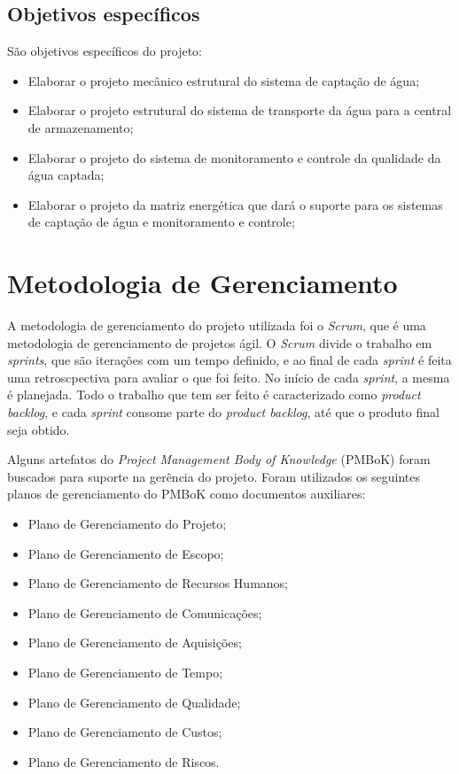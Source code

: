  \subsection{Objetivos específicos}
 
 São objetivos específicos do projeto:
 \begin{itemize}
  \item Elaborar o projeto mecânico estrutural do sistema de captação de água;
  \item Elaborar o projeto estrutural do sistema de transporte da água para a central de armazenamento;
  \item Elaborar o projeto do sistema de monitoramento e controle da qualidade da água captada;
  \item Elaborar o projeto da matriz energética que dará o suporte para os sistemas de captação de água e monitoramento e controle;
 \end{itemize}

 
\section{Metodologia de Gerenciamento}
A metodologia de gerenciamento do projeto utilizada foi o \textit{Scrum}, que é uma metodologia de gerenciamento de projetos ágil.
O \textit{Scrum} divide o trabalho em \textit{sprints}, que são iterações com um tempo definido, e ao final de cada 
\textit{sprint} é feita uma retroscpectiva para avaliar o que foi feito. No início de cada \textit{sprint},
a mesma é planejada. Todo o trabalho que tem ser feito é caracterizado como \textit{product backlog}, e cada \textit{sprint}
consome parte do \textit{product backlog}, até que o produto final seja obtido.

Alguns artefatos do \textit{Project Management Body of Knowledge} (PMBoK) foram buscados para suporte na gerência do projeto.
Foram utilizados os seguintes planos de gerenciamento do PMBoK como documentos auxiliares:

  \begin{itemize}
  \item Plano de Gerenciamento do Projeto;
  \item Plano de Gerenciamento de Escopo;
  \item Plano de Gerenciamento de Recursos Humanos;
  \item Plano de Gerenciamento de Comunicações;
  \item Plano de Gerenciamento de Aquisições;
  \item Plano de Gerenciamento de Tempo;
  \item Plano de Gerenciamento de Qualidade;
  \item Plano de Gerenciamento de Custos;
  \item Plano de Gerenciamento de Riscos.
  \end{itemize}
  

